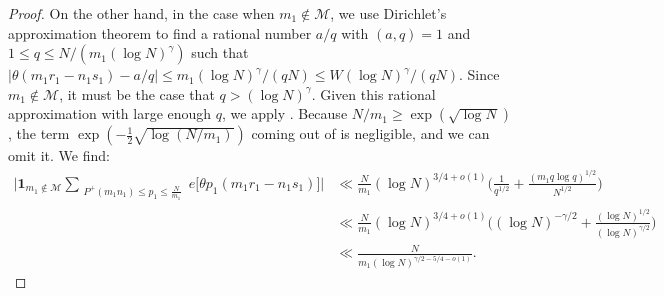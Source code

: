 \documentclass[12pt]{amsart}
\renewcommand{\le}{\leqslant}
\renewcommand{\leq}{\leqslant}
\renewcommand{\ge}{\geqslant}
\numberwithin{equation}{section}
\theoremstyle{plain}
\theoremstyle{definition}
\newcommand{\CM}{\mathcal{M}}
\begin{document}
\begin{proof}
		On the other hand, in the case when $m_1 \not\in \CM$, we use Dirichlet's approximation theorem to find a rational number $a/q$ with $(a,q) = 1$ and $1 \leq q \leq N/(m_1(\log N)^{\gamma})$ such that $|\theta (m_1r_1-n_1s_1) - a/q| \leq m_1(\log N)^{\gamma}/(q N) \le W(\log N)^\gamma/(q N)$. Since $m_1 \not \in \CM$, it must be the case that $q > (\log N)^{\gamma}$. Given this rational approximation with large enough $q$, we apply . Because $N/m_1 \ge \exp(\sqrt{\log N})$, the term $\exp(-\frac{1}{2}\sqrt{\log (N/m_1)})$ coming out of  is negligible, and we can omit it. We find:
		\begin{align*}
			\bigg| \bm{1}_{m_1 \not \in \CM} \sum_{\substack{ P^+(m_1n_1) \leq p_1 \leq \frac{N}{m_1}}} e\big[\theta p_1(m_1r_1-n_1s_1)\big]\bigg| &\ll \frac{N}{m_1}(\log N)^{3/4+o(1)} \bigg( \frac{1}{q^{1/2}} +\frac{(m_1 q \log q )^{1/2}}{N^{1/2}} \bigg)\\
			&\ll \frac{N}{m_1}(\log N)^{3/4+o(1)} \bigg( (\log N)^{-\gamma/2} +\frac{(\log N )^{1/2}}{(\log N)^{\gamma/2}} \bigg)\\
			&\ll \frac{N}{m_1 (\log N)^{\gamma/2 - 5/4 -o(1)}}.
		\end{align*}
		

\end{proof}
\end{document}
